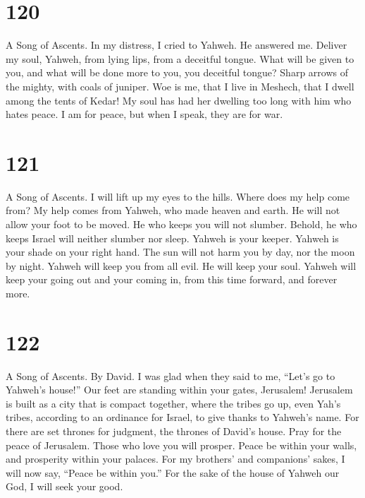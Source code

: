 \hypertarget{section-112}{%
\section{120}\label{section-112}}

A Song of Ascents.  In my distress, I cried to Yahweh. He
answered me.  Deliver my soul, Yahweh, from lying lips,
from a deceitful tongue.  What will be given to you, and
what will be done more to you, you deceitful tongue? 
Sharp arrows of the mighty, with coals of juniper.  Woe is
me, that I live in Meshech, that I dwell among the tents of Kedar!
 My soul has had her dwelling too long with him who hates
peace.  I am for peace, but when I speak, they are for
war.

\hypertarget{section-113}{%
\section{121}\label{section-113}}

A Song of Ascents.  I will lift up my eyes to the hills.
Where does my help come from?  My help comes from Yahweh,
who made heaven and earth.  He will not allow your foot to
be moved. He who keeps you will not slumber.  Behold, he
who keeps Israel will neither slumber nor sleep.  Yahweh
is your keeper. Yahweh is your shade on your right hand. 
The sun will not harm you by day, nor the moon by night. 
Yahweh will keep you from all evil. He will keep your soul.
 Yahweh will keep your going out and your coming in, from
this time forward, and forever more.

\hypertarget{section-114}{%
\section{122}\label{section-114}}

A Song of Ascents. By David.  I was glad when they said to
me, ``Let's go to Yahweh's house!''  Our feet are standing
within your gates, Jerusalem!  Jerusalem is built as a
city that is compact together,  where the tribes go up,
even Yah's tribes, according to an ordinance for Israel, to give thanks
to Yahweh's name.  For there are set thrones for judgment,
the thrones of David's house.  Pray for the peace of
Jerusalem. Those who love you will prosper.  Peace be
within your walls, and prosperity within your palaces. 
For my brothers' and companions' sakes, I will now say, ``Peace be
within you.''  For the sake of the house of Yahweh our
God, I will seek your good.

